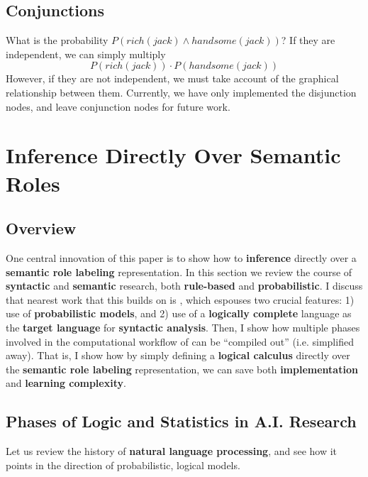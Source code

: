 \documentclass[12pt]{article}
\begin{document}
\subsection{Conjunctions}
What is the probability $P(rich(jack) \wedge handsome(jack))$?
If they are independent, we can simply multiply 
\[P(rich(jack))\cdot P(handsome(jack))\]
However, if they are not independent, we must take account of the graphical relationship between them.
Currently, we have only implemented the disjunction nodes, and leave conjunction nodes for future work.

\section{Inference Directly Over Semantic Roles}
\subsection{Overview}
One central innovation of this paper is to show how to {\bf inference} directly over a {\bf semantic role labeling} representation.
In this section we review the course of {\bf syntactic} and {\bf semantic} research, both {\bf rule-based} and {\bf probabilistic}.
I discuss that nearest work that this builds on is \cite{steedman2000, kwiatkowski2010, lewis2013combined, Zettlemoyer2012}, which espouses two crucial features: 1) use of {\bf probabilistic models}, and 2) use of a {\bf logically complete} language as the {\bf target language} for {\bf syntactic analysis}.
Then, I show how multiple phases involved in the computational workflow of \citep{steedman2000} can be ``compiled out'' (i.e. simplified away).
That is, I show how by simply defining a {\bf logical calculus} directly over the {\bf semantic role labeling} representation, we can save both {\bf implementation} and {\bf learning complexity}.
\subsection{Phases of Logic and Statistics in A.I. Research}
Let us review the history of {\bf natural language processing}, and see how it points in the direction of probabilistic, logical models.
\end{document}
